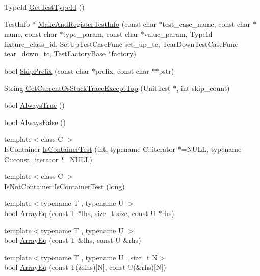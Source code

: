 \begin{DoxyCompactItemize}
\-Type\-Id \hyperlink{namespacetesting_1_1internal_a3e7f71e983859c908bae4ec8d593ff58}{\-Get\-Test\-Type\-Id} ()
\item 
\-Test\-Info $\ast$ \hyperlink{namespacetesting_1_1internal_a8f58f081cff056a35d18746667a16c4f}{\-Make\-And\-Register\-Test\-Info} (const char $\ast$test\-\_\-case\-\_\-name, const char $\ast$name, const char $\ast$type\-\_\-param, const char $\ast$value\-\_\-param, \-Type\-Id fixture\-\_\-class\-\_\-id, \-Set\-Up\-Test\-Case\-Func set\-\_\-up\-\_\-tc, \-Tear\-Down\-Test\-Case\-Func tear\-\_\-down\-\_\-tc, \-Test\-Factory\-Base $\ast$factory)
\item 
bool \hyperlink{namespacetesting_1_1internal_ac490e9b0963689436d4c483653b3f93f}{\-Skip\-Prefix} (const char $\ast$prefix, const char $\ast$$\ast$pstr)
\item 
\-String \hyperlink{namespacetesting_1_1internal_aa233c580f5aa0ac5abf54608bc3366bc}{\-Get\-Current\-Os\-Stack\-Trace\-Except\-Top} (\-Unit\-Test $\ast$, int skip\-\_\-count)
\item 
bool \hyperlink{namespacetesting_1_1internal_a7b125f3952e08530aedb98a650ee73c1}{\-Always\-True} ()
\item 
bool \hyperlink{namespacetesting_1_1internal_ab8a8bf58ff82fd6e6989ff30d9a17932}{\-Always\-False} ()
\item 
{\footnotesize template$<$class C $>$ }\\\-Is\-Container \hyperlink{namespacetesting_1_1internal_ad4dc59754643e723ba56e09275fb9eff}{\-Is\-Container\-Test} (int, typename \-C\-::iterator $\ast$=\-N\-U\-L\-L, typename \-C\-::const\-\_\-iterator $\ast$=\-N\-U\-L\-L)
\item 
{\footnotesize template$<$class C $>$ }\\\-Is\-Not\-Container \hyperlink{namespacetesting_1_1internal_aad8180962d01380f3db3e97b3815c85f}{\-Is\-Container\-Test} (long)
\item 
{\footnotesize template$<$typename T , typename U $>$ }\\bool \hyperlink{namespacetesting_1_1internal_a4290fdb0c0d7ce6f09d11d80ebe064e3}{\-Array\-Eq} (const \-T $\ast$lhs, size\-\_\-t size, const \-U $\ast$rhs)
\item 
{\footnotesize template$<$typename T , typename U $>$ }\\bool \hyperlink{namespacetesting_1_1internal_a6626d726cb8b7f0a8eea4fff8aefe092}{\-Array\-Eq} (const \-T \&lhs, const \-U \&rhs)
\item 
{\footnotesize template$<$typename T , typename U , size\-\_\-t \-N$>$ }\\bool \hyperlink{namespacetesting_1_1internal_af2bb7098fd66dabb47391adb54ae8a5d}{\-Array\-Eq} (const \-T(\&lhs)\mbox{[}\-N\mbox{]}, const \-U(\&rhs)\mbox{[}\-N\mbox{]})
$$
\end{DoxyCompactItemize}
